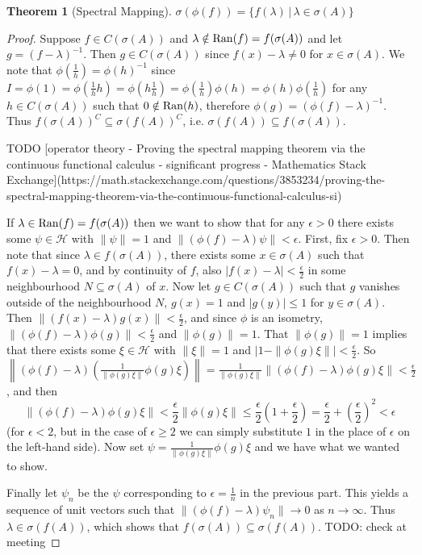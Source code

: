 \documentclass[12pt,oneside]{report}
\newtheorem{thm}{Theorem}[chapter]
\begin{document}
\begin{thm}[Spectral Mapping]
    $\sigma(\phi(f)) = \{ f(\lambda) \, | \, \lambda \in \sigma(A) \}$
\end{thm}
\begin{proof}
    Suppose $f \in C(\sigma(A))$ and $\lambda \notin \mathrm{Ran}(f) = f(\sigma(A))$ and let $g = (f - \lambda)^{-1}$. Then $g \in C(\sigma(A))$ since $f(x) - \lambda \neq 0$ for $x \in \sigma(A)$. We note that $\phi\left( \frac{1}{h} \right) = \phi(h)^{-1}$ since $I = \phi(1) = \phi\left( \frac{1}{h} h \right) = \phi\left( h \frac{1}{h} \right) = \phi\left( \frac{1}{h} \right) \phi(h) = \phi(h) \phi\left( \frac{1}{h} \right)$ for any $h \in C(\sigma(A))$ such that $0 \notin \mathrm{Ran}(h)$, therefore $\phi(g) = (\phi(f) - \lambda)^{-1}$. Thus $f(\sigma(A))^{C} \subseteq \sigma(f(A))^{C}$, i.e. $\sigma(f(A)) \subseteq f(\sigma(A))$.

    TODO [operator theory - Proving the spectral mapping theorem via the continuous functional calculus - significant progress - Mathematics Stack Exchange](https://math.stackexchange.com/questions/3853234/proving-the-spectral-mapping-theorem-via-the-continuous-functional-calculus-si)

    If $\lambda \in \mathrm{Ran}(f) = f(\sigma(A))$ then we want to show that for any $\epsilon > 0$ there exists some $\psi \in \mathscr{H}$ with $\|\psi\| = 1$ and $\|(\phi(f) - \lambda)\psi\| < \epsilon$. First, fix $\epsilon > 0$. Then note that since $\lambda \in f(\sigma(A))$, there exists some $x \in \sigma(A)$ such that $f(x) - \lambda = 0$, and by continuity of $f$, also $|f(x) - \lambda| < \frac{\epsilon}{2}$ in some neighbourhood $N \subseteq \sigma(A)$ of $x$. Now let $g \in C(\sigma(A))$ such that $g$ vanishes outside of the neighbourhood $N$, $g(x) = 1$ and $|g(y)| \leq 1$ for $y \in \sigma(A)$. Then $\|(f(x) - \lambda)g(x)\| < \frac{\epsilon}{2}$, and since $\phi$ is an isometry, $\|(\phi(f) - \lambda)\phi(g)\| < \frac{\epsilon}{2}$ and $\|\phi(g)\| = 1$. That $\|\phi(g)\| = 1$ implies that there exists some $\xi \in \mathscr{H}$ with $\|\xi\| = 1$ and $|1 - \|\phi(g)\xi\|| < \frac{\epsilon}{2}$. So $\left\|(\phi(f) - \lambda)\left(\frac{1}{\|\phi(g)\xi\|}\phi(g)\xi\right)\right\| = \frac{1}{\|\phi(g)\xi\|} \|(\phi(f) - \lambda)\phi(g)\xi\| < \frac{\epsilon}{2}$, and then $$\|(\phi(f) - \lambda)\phi(g)\xi\| < \frac{\epsilon}{2}\|\phi(g)\xi\| \leq \frac{\epsilon}{2}\left( 1 + \frac{\epsilon}{2} \right) = \frac{\epsilon}{2} + \left( \frac{\epsilon}{2} \right)^{2} < \epsilon$$ (for $\epsilon < 2$, but in the case of $\epsilon \geq 2$ we can simply substitute $1$ in the place of $\epsilon$ on the left-hand side). Now set $\psi = \frac{1}{\|\phi(g)\xi\|}\phi(g)\xi$ and we have what we wanted to show.

    Finally let $\psi_{n}$ be the $\psi$ corresponding to $\epsilon = \frac{1}{n}$ in the previous part. This yields a sequence of unit vectors such that $\|(\phi(f) - \lambda)\psi_{n}\| \to 0$ as $n \to \infty$. Thus $\lambda \in \sigma(f(A))$, which shows that $f(\sigma(A)) \subseteq \sigma(f(A))$. TODO: check at meeting
\end{proof}
\end{document}
